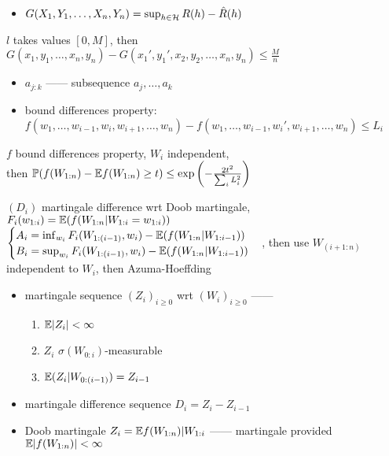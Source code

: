 \begin{itemize}
    \item $G(X_1, Y_1, \dots, X_n, Y_n) = \sup_{h \in \mathcal{H}} R(h) - \hat R(h)$
\end{itemize}
\begin{fact}
    $l$ takes values $[0, M]$, then $G(x_1, y_1, \dots, x_n, y_n) - G(x_1', y_1', x_2, y_2, \dots, x_n, y_n)\leq \frac{M}{n}$
\end{fact}

\begin{itemize}
    \item $a_{j:k}$ ------ subsequence $a_j, \dots, a_k$
    \item bound differences property:\\
    $f(w_1, \dots, w_{i-1}, w_i, w_{i+1}, \dots, w_n) - f(w_1, \dots, w_{i-1}, w_i', w_{i+1}, \dots, w_n) \leq L_i$
\end{itemize}

\begin{thm}
    $f$ bound differences property, $W_i$ independent,\\
    then $\mathbb{P}(f(W_{1:n}) - \mathbb{E} f(W_{1:n}) \geq t) \leq \exp \left( - \frac{2t^2}{\sum_i L_i^2} \right)$
\end{thm}
\begin{pf}
    $(D_i)$ martingale difference wrt Doob martingale, $F_i(w_{1:i}) = \mathbb{E}(f(W_{1:n}|W_{1:i} = w_{1:i}))$
    $\begin{cases}
         A_i = \inf_{w_i} F_i (W_{1:(i-1)}, w_i) - \mathbb{E}( f(W_{1:n}|W_{1:i-1}))\\
         B_i = \sup_{w_i} F_i (W_{1:(i-1)}, w_i) - \mathbb{E}( f(W_{1:n}|W_{1:i-1}))
    \end{cases}$, then use $W_{(i+1:n)}$ independent to $W_i$, then Azuma-Hoeffding
\end{pf}

\begin{itemize}
    \item martingale sequence $(Z_i)_{i \geq 0}$ wrt $(W_i)_{i \geq 0}$ ------
    \begin{enumerate}
        \item $\mathbb{E}|Z_i| < \infty$
        \item $Z_i$ $\sigma(W_{0:i})$-measurable
        \item $\mathbb{E} (Z_i|W_{0:(i-1)}) = Z_{i-1}$
    \end{enumerate}
    \item martingale difference sequence $D_i = Z_i - Z_{i-1}$
    \item Doob martingale $Z_i = \mathbb{E} f(W_{1:n}) | W_{1:i}$ ------ martingale provided $\mathbb{E} |f(W_{1:n})| < \infty$
\end{itemize}

